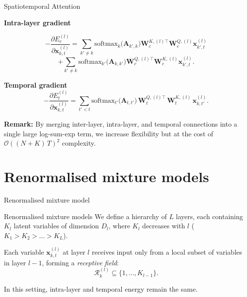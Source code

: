 \documentclass{beamer}
\begin{document}
\begin{frame}{Spatiotemporal Attention}

    \textbf{Intra-layer gradient}

    \[
    -\frac{\partial E_{c}^{(l)}}{\partial \bm{x}_{k,t}^{(l)}}
    =
    \sum_{k'\neq k}
    \mathrm{softmax}_{k}\bigl(\bm{A}_{k',k}\bigr)
    \bm{W}_{c}^{K,(l)\top} \bm{W}_{c}^{Q,(l)} \bm{x}_{k',t}^{(l)}
\]
\[
    +
    \sum_{k'\neq k}
    \mathrm{softmax}_{k'}\bigl(\bm{A}_{k, k'}\bigr)
    \bm{W}_{c}^{Q,(l)\top} \bm{W}_{c}^{K,(l)} \bm{x}_{k',t}^{(l)}.
\]

\textbf{Temporal gradient}
\[
-\frac{\partial E_{t}^{(l)}}{\partial \bm{x}_{k,t}^{(l)}}
=
\sum_{t'<t}
\mathrm{softmax}_{t'}\bigl(\bm{A}_{t,t'}\bigr)\,
\bm{W}_{t}^{Q,(l)\top}\,\bm{W}_{t}^{K,(l)}\,\bm{x}_{k,t'}^{(l)}.
\]

\textbf{Remark:} 
By merging inter-layer, intra-layer, and temporal connections into a single large log-sum-exp term, we increase flexibility but at the cost of \(\mathcal{O}((N + K)\,T)^2\) complexity.

\end{frame}

\section{Renormalised mixture models}

\begin{frame}
    \centering
    \Huge Renormalised mixture model
\end{frame}


\begin{frame}{Renormalised mixture models}
    We define a hierarchy of \(L\) layers, each containing \(K_l\) latent variables of dimension \(D_l\), where \(K_l\) decreases with \(l\) (\(K_1 > K_2 > \dots > K_L\)). 

    \bigskip

    Each variable \(\bm{x}_{k,t}^{(l)}\) at layer \(l\) receives input only from a local subset of variables in layer \(l-1\), forming a \emph{receptive field}:
    \[
    \mathcal{R}_{k}^{(l)} \subseteq \{1, \dots, K_{l-1}\}.
    \]

    In this setting, intra-layer and temporal energy remain the same.

\end{frame}
\end{document}
